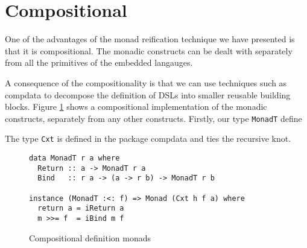\section{Compositional} 

One of the advantages of the monad reification technique we have
presented is that it is compositional. The monadic constructs can be
dealt with separately from all the primitives of the embedded
langauges.

A consequence of the compositionality is that we can use techniques
such as compdata \cite{} to decompose the definition of DSLs into
smaller reusable building blocks. Figure \ref{fig:compdata} shows a
compositional implementation of the monadic constructs, separately
from any other constructs. Firstly, our type \verb!MonadT! define

The type \verb!Cxt! is defined in the
package compdata and ties the recursive knot.

\begin{figure}
\begin{verbatim}
data MonadT r a where
  Return :: a -> MonadT r a
  Bind   :: r a -> (a -> r b) -> MonadT r b

instance (MonadT :<: f) => Monad (Cxt h f a) where
  return a = iReturn a
  m >>= f  = iBind m f
\end{verbatim}
\label{fig:compdata}
\caption{Compositional definition monads}
\end{figure}
